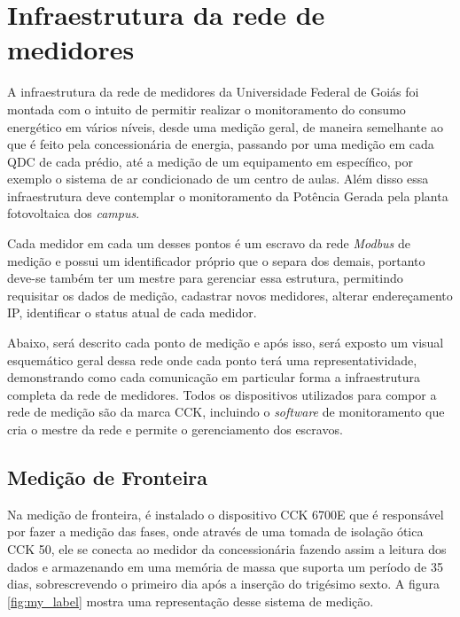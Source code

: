 \chapter{Infraestrutura da rede de medidores}
\label{c:infraestrutura_da_rede_de_medidores}
A infraestrutura da rede de medidores da Universidade Federal de Goiás foi montada com o intuito de permitir realizar o monitoramento do consumo energético em vários níveis, desde uma medição geral, de maneira semelhante ao que é feito pela concessionária de energia, passando por uma medição em cada QDC de cada prédio, até a medição de um equipamento em específico, por exemplo o sistema de ar condicionado de um centro de aulas. Além disso essa infraestrutura deve contemplar o monitoramento da Potência Gerada pela planta fotovoltaica dos \textit{campus}.

Cada medidor em cada um desses pontos é um escravo da rede \textit{Modbus} de medição e possui um identificador próprio que o separa dos demais, portanto deve-se também ter um mestre para gerenciar essa estrutura, permitindo requisitar os dados de medição, cadastrar novos medidores, alterar endereçamento IP, identificar o status atual de cada medidor.

Abaixo, será descrito cada ponto de medição e após isso, será exposto um visual esquemático geral dessa rede onde cada ponto terá uma representatividade, demonstrando como cada comunicação em particular forma a infraestrutura completa da rede de medidores. Todos os dispositivos utilizados para compor a rede de medição são da marca CCK, incluindo o \textit{software} de monitoramento que cria o mestre da rede e permite o gerenciamento dos escravos.

\section{Medição de Fronteira}
\label{sec:medicao-de-fronteira}

Na medição de fronteira, é instalado o dispositivo CCK 6700E que é responsável por fazer a medição das fases, onde através de uma tomada de isolação ótica CCK 50, ele se conecta ao medidor da concessionária fazendo assim a leitura dos dados e armazenando em uma memória de massa que suporta um período de 35 dias, sobrescrevendo o primeiro dia após a inserção do trigésimo sexto. A figura \ref{fig:my_label} mostra uma representação desse sistema de medição.


